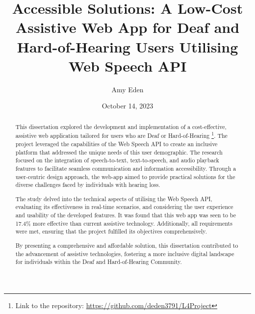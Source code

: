 \documentclass{l4proj}
\begin{document}
\title{Accessible Solutions: A Low-Cost Assistive Web App for Deaf and Hard-of-Hearing Users Utilising Web Speech API}
\author{Amy Eden}
\date{October 14, 2023}

\maketitle

\begin{abstract}

This dissertation explored the development and implementation of a cost-effective, assistive web application tailored for users who are Deaf or Hard-of-Hearing \footnote{Link to the repository: \url{https://github.com/deden3791/L4Project}}. The project leveraged the capabilities of the Web Speech API to create an inclusive platform that addressed the unique needs of this user demographic. The research focused on the integration of speech-to-text, text-to-speech, and audio playback features to facilitate seamless communication and information accessibility. Through a user-centric design approach, the web-app aimed to provide practical solutions for the diverse challenges faced by individuals with hearing loss.

The study delved into the technical aspects of utilising the Web Speech API, evaluating its effectiveness in real-time scenarios, and considering the user experience and usability of the developed features. It was found that this web app was seen to be 17.4\% more effective than current assistive technology. Additionally, all requirements were met, ensuring that the project fulfilled its objectives comprehensively.

By presenting a comprehensive and affordable solution, this dissertation contributed to the advancement of assistive technologies, fostering a more inclusive digital landscape for individuals within the Deaf and Hard-of-Hearing Community. 
    
\end{abstract}

%
%
\def\consentname {Amy Eden} %
\def\consentdate {07 March 2024} %
%
\educationalconsent
\end{document}
